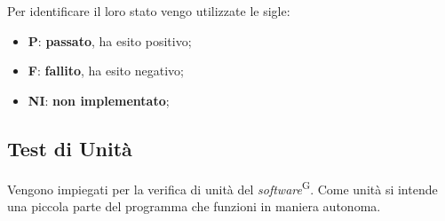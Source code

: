 \documentclass[5pt]{article}
\begin{document}
	Per identificare il loro stato vengo utilizzate le sigle:
	\begin{itemize}
		\item \textbf{P}:  \textbf{passato}, ha esito positivo;
		\item \textbf{F}:  \textbf{fallito}, ha esito negativo;
		\item \textbf{NI}: \textbf{non implementato};
	\end{itemize}
	
	\subsection{Test di Unità}
	Vengono impiegati per la verifica di unità del \textit{software}\textsuperscript{G}. Come unità si intende una piccola parte del programma che funzioni in maniera autonoma.
	
\end{document}
